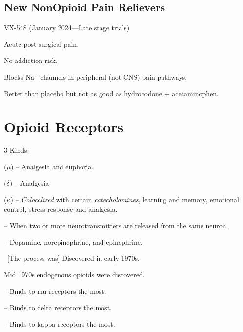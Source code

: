 \subsection{New NonOpioid Pain Relievers}

\begin{coloredlist}
    \item VX-548 (January 2024---Late stage trials)
    \begin{coloredlist}
        \item Acute post-surgical pain.
        \item No addiction risk.
    \end{coloredlist}
    \item Blocks Na\(^{+}\) channels in peripheral (not CNS) pain pathways.
    \item Better than placebo but not as good as hydrocodone + acetaminophen.
\end{coloredlist}

\section{Opioid Receptors}

\begin{coloredlist}
    \item 3 Kinds:
    \begin{coloredlist}
        \item {} (\(\mu\)) -- Analgesia and euphoria.
        \item {} (\(\delta\)) -- Analgesia
        \item {} (\(\kappa\)) -- \textit{Colocalized} with certain \textit{catecholamines}, learning and memory, emotional control, stress response and analgesia.
        \begin{coloredlist}
            \item {} -- When two or more neurotransmitters are released from the same neuron.
            \item {} -- Dopamine, norepinephrine, and epinephrine.
        \end{coloredlist}        
    \end{coloredlist}
    \item\ [The process was] Discovered in early 1970s.
    \item Mid 1970s endogenous opioids were discovered.
    \begin{coloredlist}
        \item {} -- Binds to mu receptors the most.
        \item {} -- Binds to delta receptors the most.
        \item {} -- Binds to kappa receptors the most.
    \end{coloredlist}
\end{coloredlist}

